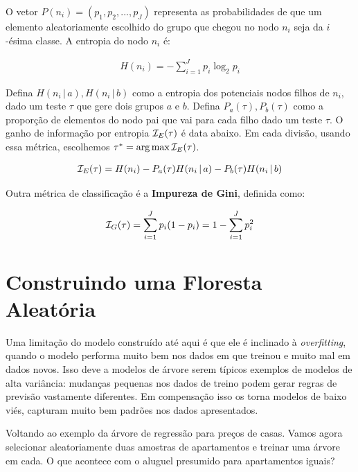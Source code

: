 O vetor $P(n_i) = (p_1, p_2, ..., p_J)$ representa as probabilidades de que um elemento aleatoriamente escolhido do grupo que chegou no nodo $n_i$ seja da $i$-ésima classe. A entropia do nodo $n_i$ é:

\begin{align}
    H(n_i) = - \sum_{i = 1}^J p_i \log_2 p_i
\end{align}

Defina $H(n_i \, | \, a), H(n_i \, |\,  b)$ como a entropia dos potenciais nodos filhos de $n_i$, dado um teste $\tau$ que gere dois grupos $a$ e $b$. Defina $P_a(\tau), P_b(\tau)$ como a proporção de elementos do nodo pai que vai para cada filho dado um teste $\tau$. O ganho de informação por entropia $\mathcal{I}_E(\tau)$ é data abaixo. Em cada divisão, usando essa métrica, escolhemos $\tau^* = \operatorname*{arg\,max}{\mathcal{I}_E(\tau)}$.

\begin{align}
    \mathcal{I}_E(\tau) = H(n_i) - P_a(\tau) H(n_i \, |\,  a) - P_b(\tau) H(n_i \, |\,  b)
\end{align}

 Outra métrica de classificação é a \textbf{Impureza de Gini}, definida como:
 
 \begin{align}
     \mathcal{I}_G(\tau) = \sum_{i = 1}^J p_i ( 1  - p_i) =  1 - \sum_{i = 1}^J p_i^2
 \end{align}


 \section{Construindo uma Floresta Aleatória}
 

Uma limitação do modelo construído até aqui é que ele é inclinado à \textit{overfitting}, quando o modelo performa muito bem nos dados em que treinou e muito mal em dados novos. Isso deve a modelos de árvore serem típicos exemplos de modelos de alta variância: mudanças pequenas nos dados de treino podem gerar regras de previsão vastamente diferentes. Em compensação isso os torna modelos de baixo viés, capturam muito bem padrões nos dados apresentados. 

\begin{exemplo}
Voltando ao exemplo da árvore de regressão para preços de casas. Vamos agora selecionar aleatoriamente duas amostras de apartamentos e treinar uma árvore em cada. O que acontece com o aluguel presumido para apartamentos iguais?




\end{exemplo}




